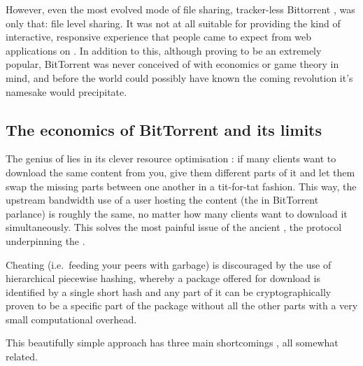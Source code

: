 However, even the most evolved mode of  file sharing, tracker-less Bittorrent \cite{pouwelse2005bittorrent}, was only that: file level sharing. It was not at all suitable for providing the kind of interactive, responsive experience that people came to expect from web applications on . In addition to this, although proving to be an extremely popular, BitTorrent was never conceived of with economics or game theory in mind, and before the world could possibly have known the coming revolution it's namesake would precipitate.

\subsection{The economics of BitTorrent and its limits \statusgreen}

The genius of  lies in its clever resource optimisation \cite{cohen2003incentives}: if many clients want to download the same content from you, give them different parts of it and let them swap the missing parts between one another in a tit-for-tat fashion. This way, the upstream bandwidth use of a user hosting the content (the  in BitTorrent parlance) is roughly the same, no matter how many clients want to download it simultaneously. This solves the most painful issue of the ancient , the protocol underpinning the .

Cheating (i.e.\ feeding your peers with garbage) is discouraged by the use of hierarchical piecewise hashing, whereby a package offered for download is identified by a single short hash and any part of it can be cryptographically proven to be a specific part of the package without all the other parts with a very small computational overhead. 

This beautifully simple approach has three main shortcomings \cite{locher2006free,piatek2007incentives}, all somewhat related.

